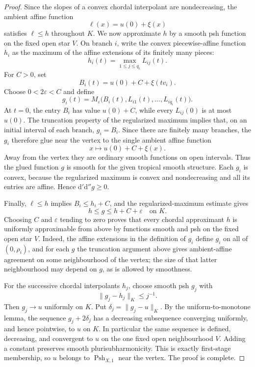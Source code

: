\begin{proof}
Since the slopes of a convex chordal interpolant are nondecreasing, the
ambient affine function
\[
                         \ell(x)=u(0)+\xi(x)
\]
satisfies $\ell\leq h$ throughout $K$.  We now approximate $h$ by a smooth
psh function on the fixed open star $V$.  On branch $i$, write the convex
piecewise-affine function $h_i$ as the maximum of the affine extensions of
its finitely many pieces:
\[
                         h_i(t)=\max_{1\leq j\leq q_i}L_{ij}(t).
\]
For $C>0$, set
\[
                         B_i(t)=u(0)+C+\xi(tv_i).
\]
Choose $0<2\varepsilon<C$ and define
\[
 g_i(t)=M_\varepsilon
       \bigl(B_i(t),L_{i1}(t),\ldots,L_{iq_i}(t)\bigr).
\]
At $t=0$, the entry $B_i$ has value $u(0)+C$, while every $L_{ij}(0)$ is
at most $u(0)$.  The truncation property of the regularized maximum implies
that, on an initial interval of each branch, $g_i=B_i$.  Since there are
finitely many branches, the $g_i$ therefore glue near the vertex to the
single ambient affine function
\[
                         x\longmapsto u(0)+C+\xi(x).
\]
Away from the vertex they are ordinary smooth functions on open intervals.
Thus the glued function $g$ is smooth for the given tropical smooth
structure.  Each $g_i$ is convex, because the regularized maximum is convex
and nondecreasing and all its entries are affine.  Hence
$\mathrm d'\mathrm d''g\geq0$.

Finally, $\ell\leq h$ implies $B_i\leq h_i+C$, and the regularized-maximum
estimate gives
\[
                         h\leq g\leq h+C+\varepsilon
                         \quad\text{on }K.
\]
Choosing $C$ and $\varepsilon$ tending to zero proves that every chordal
approximant $h$ is uniformly approximable from above by functions smooth
and psh on the fixed open star $V$.  Indeed, the affine extensions in the
definition of $g_i$ define $g_i$ on all of $(0,\rho_i)$, and for each $g$
the truncation argument above gives ambient-affine agreement on some
neighbourhood of the vertex; the size of that latter neighbourhood may
depend on $g$, as is allowed by smoothness.

For the successive chordal interpolants $h_j$, choose smooth psh $g_j$ with
\[
                         \lVert g_j-h_j\rVert_K\leq j^{-1}.
\]
Then $g_j\to u$ uniformly on $K$.  Put
$\delta_j=\lVert g_j-u\rVert_K$.  By the uniform-to-monotone lemma, the
sequence $g_j+2\delta_j$ has a decreasing subsequence converging uniformly,
and hence pointwise, to $u$ on $K$.  In particular the same sequence is
defined, decreasing, and convergent to $u$ on the one fixed open
neighbourhood $V$.  Adding a constant preserves smooth
plurisubharmonicity.  This is exactly first-stage membership, so $u$ belongs
to $\operatorname{Psh}_{X,1}$ near the vertex.  The proof is complete.
\end{proof}

